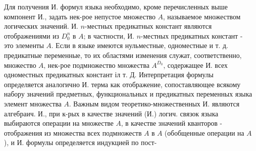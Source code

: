 \documentclass[10pt]{article}
\begin{document}
Для получения И. формул языка необходимо, кроме перечисленных выше компонент И., задать нек-рое непустое множество $A$, называемое множеством логических значений. И. $n$-местных предикатных констант являются отображениями из $D_{0}^{n}$ в $A$; в частности, И. $n$-местных предикатных констант - это элементы $A$. Если в языке имеются нульместные, одноместные и т. д. предикатные переменные, то их областями изменения служат, соответственно, множество $A$, нек-рое подмножество множества $A^{D_{0}}$, содержащее И. всех одноместных предикатных констант іл т. Д. Интерпретация формулы определяется аналогично И. терма как отображение, сопоставляющее всякому набору значений предметных, функциональных и предикатных переменных языка элемент множества $A$. Важным видом теоретико-множественных И. являются алгебраич. И., при к-рых в качестве значений (И.) логич. связок языка выбираются операции на множестве $A$, в качестве значений кванторов - отображения из множества всех подмножеств $A$ в $A$ (обобщенные операции на $A$ ), и И. формулы определяется индукцией по пост-
\end{document}
